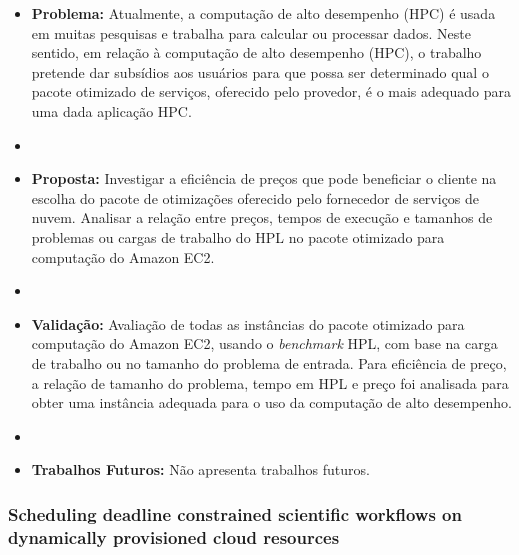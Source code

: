 \documentclass[tese,capa]{texufpel}
\begin{document}
\begin{itemize}[label={},noitemsep]
  \item \textbf{Problema:} Atualmente, a computação de alto desempenho (HPC) é usada em muitas pesquisas e trabalha para calcular ou processar dados. Neste sentido, em relação à computação de alto desempenho (HPC), o trabalho pretende dar subsídios aos usuários para que possa ser determinado qual o pacote otimizado de serviços, oferecido pelo provedor, é o mais adequado para uma dada aplicação HPC.
  \item 
  \item \textbf{Proposta:} Investigar a eficiência de preços que pode beneficiar o cliente na escolha do pacote de otimizações oferecido pelo fornecedor de serviços de nuvem. Analisar a relação entre preços, tempos de execução e tamanhos de problemas ou cargas de trabalho do HPL no pacote otimizado para computação do Amazon EC2.
  \item 
  \item \textbf{Validação:} Avaliação de todas as instâncias do pacote otimizado para computação do Amazon EC2, usando o \textit{benchmark} HPL, com base na carga de trabalho ou no tamanho do problema de entrada. Para eficiência de preço, a relação de tamanho do problema, tempo em HPL e preço foi analisada para obter uma instância adequada para o uso da computação de alto desempenho.
  \item 
  \item \textbf{Trabalhos Futuros:} Não apresenta trabalhos futuros. 
\end{itemize}

\subsubsection{Scheduling deadline constrained scientific workflows on dynamically provisioned cloud resources} \cite{arabnejadSchedulingDeadlineConstrained2017c}
\end{document}
